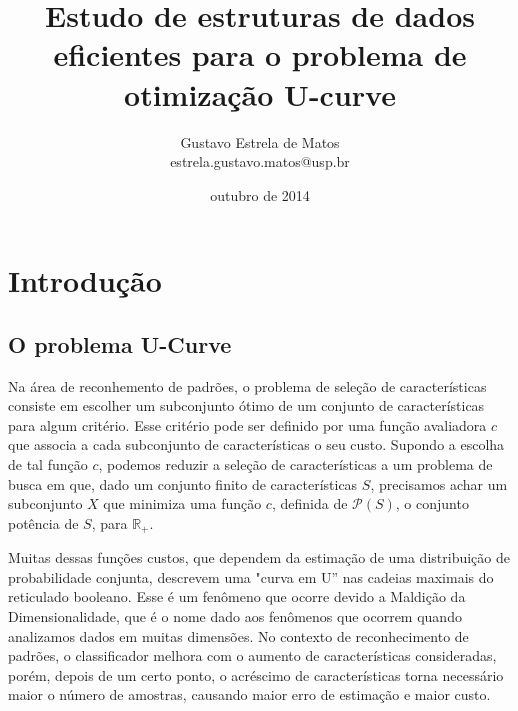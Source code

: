 \documentclass[12pt]{article}
\begin{document}
\title{Estudo de estruturas de dados eficientes para o problema de otimização U-curve} 
\author{Gustavo Estrela de Matos \\ estrela.gustavo.matos@usp.br} 
\date{outubro de 2014}

\maketitle

\def \negritovi {\textbf}

\tableofcontents 
\pagebreak

\section{Introdução}
\subsection{O problema U-Curve}
Na área de reconhemento de padrões, o problema de seleção de características consiste em escolher um subconjunto ótimo de um conjunto de características para algum critério. Esse critério pode ser definido por uma função avaliadora \begin{math}c\end{math} que associa a cada subconjunto de características o seu custo. Supondo a escolha de tal função \begin{math}c\end{math}, podemos reduzir a seleção de características a um problema de busca em que, dado um conjunto finito de características \begin{math}S\end{math}, precisamos achar um subconjunto \begin{math}X\end{math} que minimiza uma função \begin{math}c\end{math}, definida de $\mathcal{P}$\begin{math}(S)\end{math}, o conjunto potência de \begin{math}S\end{math},  para $\mathbb{R_+}$.

Muitas dessas funções custos, que dependem da estimação de uma distribuição de probabilidade conjunta, descrevem uma "curva em U'' nas cadeias maximais do reticulado booleano. Esse é um fenômeno que ocorre devido a Maldição da Dimensionalidade, que é o nome dado aos fenômenos que ocorrem quando analizamos dados em muitas dimensões. No contexto de reconhecimento de padrões, o classificador melhora com o aumento de características consideradas, porém, depois de um certo ponto, o acréscimo de características torna necessário maior o número de amostras, causando maior erro de estimação e maior custo.
\end{document}

